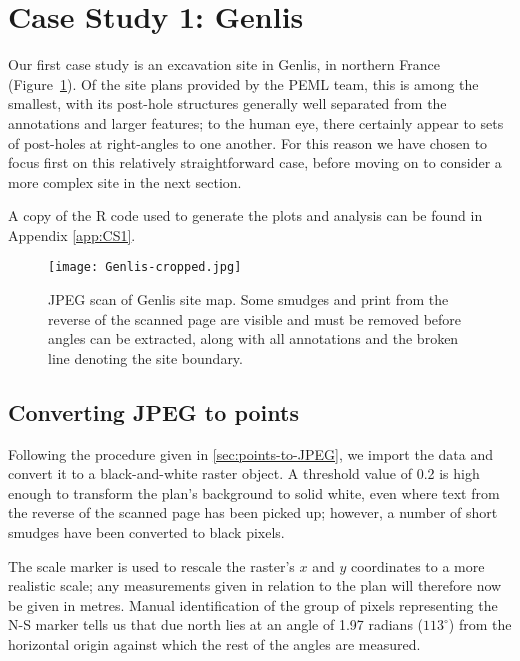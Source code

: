 \documentclass[../../ArchStats.tex]{subfiles}
\begin{document}
\section{Case Study 1: Genlis}
\label{sec:CS1}

Our first case study is an excavation site in Genlis, in northern France (Figure~\ref{fig:Genlis-JPEG}). Of the site plans provided by the PEML team, this is among the smallest, with its post-hole structures generally well separated from the annotations and larger features; to the human eye, there certainly appear to sets of post-holes at right-angles to one another. For this reason we have chosen to focus first on this relatively straightforward case, before moving on to consider a more complex site in the next section.

A copy of the R code used to generate the plots and analysis can be found in Appendix \ref{app:CS1}.

\begin{figure}[!h]
\label{fig:Genlis-JPEG}
\centering
\caption{JPEG scan of Genlis site map. Some smudges and print from the reverse of the scanned page are visible and must be removed before angles can be extracted, along with all annotations and the broken line denoting the site boundary.}
\texttt{[image: Genlis-cropped.jpg]}
\end{figure}


\subsection{Converting JPEG to points}

Following the procedure given in \ref{sec:points-to-JPEG}, we import the data and convert it to a black-and-white raster object. A threshold value of 0.2 is high enough to transform the plan's background to solid white, even where text from the reverse of the scanned page has been picked up; however, a number of short smudges have been converted to black pixels.

The scale marker is used to rescale the raster's $x$ and $y$ coordinates to a more realistic scale; any measurements given in relation to the plan will therefore now be given in metres. Manual identification of the group of pixels representing the N-S marker tells us that due north lies at an angle of 1.97 radians ($113^\circ$) from the horizontal origin against which the rest of the angles are measured.
\end{document}
